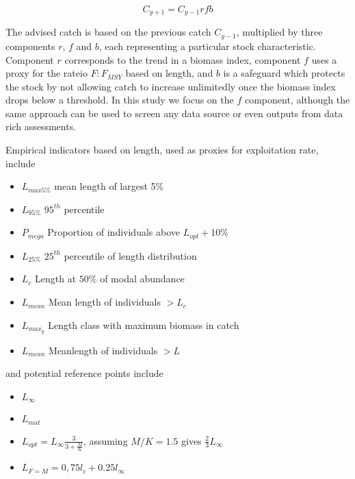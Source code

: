 \documentclass[12pt,doublespacing,a4paper]{ouparticle}
\begin{document}
\begin{equation} C_{y+1} = C_{y-1}rfb \end{equation}

The advised catch is based on the previous catch $C_{y-1}$, multiplied by three components $r$, $f$ and $b$, each representing a particular stock characteristic. Component $r$ corresponds to the trend in a biomass index, component $f$ uses a proxy  for the rateio $F:F_{MSY}$ based on length, and $b$ is a safeguard which protects the stock by not allowing catch to increase unlimitedly once the biomass index drops below a threshold. In this study we focus on the $f$ component, although the same approach can be used to screen any data source or even outputs from data rich assessments.

Empirical indicators based on length, used as proxies for exploitation rate, include

\begin{itemize}
 \item $L_{max5\%}$ mean length of largest 5\%
 \item $L_{95\%}$ $95^{th}$ percentile
 \item $P_{mega}$ Proportion of individuals above $L_{opt} + 10\%$
 \item $L_{25\%}$ $25^{th}$ percentile of length distribution
 \item $L_{c}$ Length at $50\%$ of modal abundance
 \item $L_{mean}$ Mean length of individuals $> L_c$
 \item $L_{max_{y}}$ Length class with maximum biomass in catch
 \item $L_{mean}$ Meanlength of individuals $> L$
\end{itemize}

and potential reference points include

\begin{itemize}
 \item $L_{\infty}$
 \item $L_{mat}$
 \item $L_{opt} = L_{\infty}\frac{3}{3+\frac{M}{K}}$, assuming $M/K = 1.5$ gives $\frac{2}{3}L_{\infty}$
 \item $L_{F=M} =  0,75l_c+0.25l_{\infty}$
\end{itemize}
\end{document}
